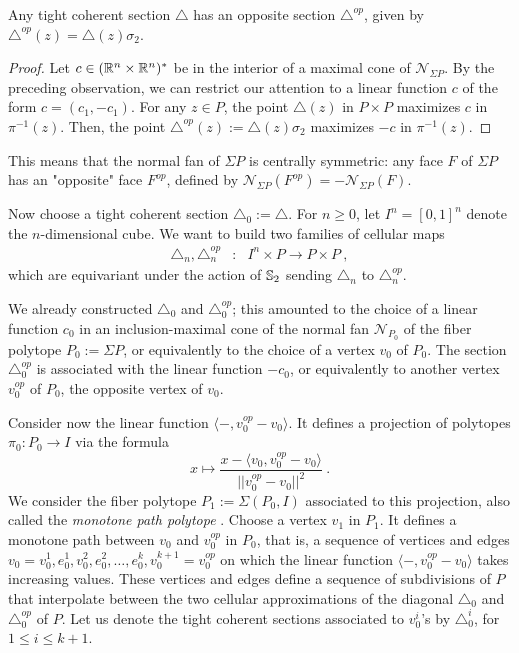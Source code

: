 \begin{proposition} Any tight coherent section $\triangle$ has an opposite section $\triangle^{op}$, given by $\triangle^{op}(z)=\triangle(z)\sigma_2$. 
\end{proposition}
\begin{proof} Let $c\in (\R^n\times\R^n)^{*}$ be in the interior of a maximal cone of $\mathcal{N}_{\Sigma P}$. By the preceding observation, we can restrict our attention to a linear function $c$ of the form $c=(c_1,-c_1)$. For any $z\in P$, the point $\triangle(z)$ in $P\times P$ maximizes $c$ in $\pi^{-1}(z)$. Then, the point $\triangle^{op}(z):=\triangle(z)\sigma_2$ maximizes $-c$ in $\pi^{-1}(z)$.
\end{proof}

This means that the normal fan of $\Sigma P$ is centrally symmetric: any face $F$ of $\Sigma P$ has an "opposite" face $F^{op}$, defined by $\mathcal{N}_{\Sigma P}(F^{op})=-\mathcal{N}_{\Sigma P}(F)$. 

Now choose a tight coherent section $\triangle_0:=\triangle$. For $n\geq 0$, let $I^n=[0,1]^n$ denote the $n$-dimensional cube. We want to build two families of cellular maps
\begin{eqnarray*}
\triangle_n, \triangle^{op}_n & : & I^n \times P \to P\times P  \ ,
\end{eqnarray*}
which are equivariant under the action of $\S_2$ sending $\triangle_n$ to $\triangle^{op}_n$.

We already constructed $\triangle_0$ and $\triangle^{op}_0$; this amounted to the choice of a linear function $c_0$ in an inclusion-maximal cone of the normal fan $\mathcal{N}_{P_0}$ of the fiber polytope $P_0:=\Sigma P$, or equivalently to the choice of a vertex $v_0$ of $P_0$. The section $\triangle^{op}_0$ is associated with the linear function $-c_0$, or equivalently to another vertex $v^{op}_0$ of $P_0$, the opposite vertex of $v_0$. 


Consider now the linear function $\langle - , v^{op}_0-v_0 \rangle$. It defines a projection of polytopes $\pi_0 : P_0 \to I$ via the formula
$$ x \mapsto \frac{x-\langle v_0, v^{op}_0-v_0 \rangle}{||v^{op}_0-v_0||^2} \ . $$
We consider the fiber polytope $P_1:=\Sigma(P_0,I)$ associated to this projection, also called the \emph{monotone path polytope} \cite[Chapter 9]{Ziegler95}. Choose a vertex $v_1$ in $P_1$. It defines a monotone path between $v_0$ and $v^{op}_0$ in $P_0$, that is, a sequence of vertices and edges $v_0=v_0^1,e_0^1,v_0^2, e_0^2, \ldots,e_0^k, v_0^{k+1}=v^{op}_0$ on which the linear function $\langle - , v^{op}_0-v_0 \rangle$ takes increasing values. These vertices and edges define a sequence of subdivisions of $P$ that interpolate between the two cellular approximations of the diagonal $\triangle_0$ and $\triangle^{op}_0$ of $P$. Let us denote the tight coherent sections associated to $v_0^i$'s by $\triangle_0^i$, for $1\leq i \leq k+1$.  

